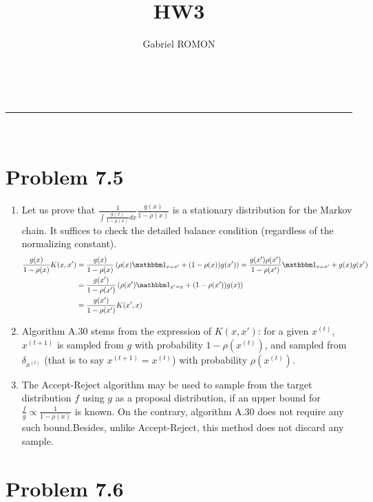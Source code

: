 \documentclass[a4paper,11pt, hidelinks]{article}
\makeatletter
\newcommand{\linia}{\rule{\linewidth}{0.5pt}}
\renewcommand{\maketitle}{
\begin{center}
\vspace{2ex}
{\huge \textsc{\@title}}
\vspace{1ex}
\\
\linia\\
\@author 
\vspace{4ex}
\end{center}
}
\makeatother
\begin{document}
\title{HW3}

\author{Gabriel ROMON}



\maketitle

\section*{Problem 7.5}

\begin{enumerate}[label=(\alph*)]
  \item Let us prove that $\frac 1{\int \frac{g(x)}{1-\rho(x)}dx}\frac{g(x)}{1-\rho(x)}$ is a stationary distribution for the Markov chain. It suffices to check the detailed balance condition (regardless of the normalizing constant). 
$$  \begin{aligned}
    \frac{g(x)}{1-\rho(x)} K(x,x') &=  \frac{g(x)}{1-\rho(x)} \left(\rho(x) \mathbbm 1_{x=x'}+(1-\rho(x))g(x') \right) 
    =  \frac{g(x')\rho(x')}{1-\rho(x')}\mathbbm 1_{x=x'} + g(x)g(x')  \\
    &= \frac{g(x')}{1-\rho(x')} \left(\rho(x') \mathbbm 1_{x'=x}+(1-\rho(x'))g(x) \right)\\
    &= \frac{g(x')}{1-\rho(x')} K(x',x)
  \end{aligned}$$

  \item Algorithm A.30 stems from the expression of $K(x,x')$: for a given $x^{(t)}$, $x^{(t+1)}$ is sampled from $g$ with probability $1-\rho(x^{(t)})$, and sampled from $\delta_{x^{(t)}}$ (that is to say $x^{(t+1)} = x^{(t)}$) with probability $\rho(x^{(t)})$.

  \item The Accept-Reject algorithm may be used to sample from the target distribution $f$ using $g$ as a proposal distribution, if an upper bound for $\displaystyle \frac fg \propto \frac{1}{1-\rho(x)}$ is known. On the contrary, algorithm A.30 does not require any such bound.\newline Besides, unlike Accept-Reject, this method does not discard any sample.
\end{enumerate}


\section*{Problem 7.6}
\end{document}
